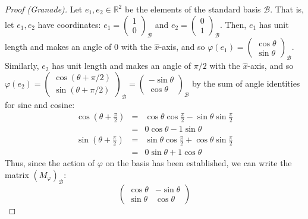 \documentclass[10pt]{article}
\newcommand{\R}{\mathbb{R}}
\renewcommand{\phi}{\varphi}
\begin{document}
\begin{itemize}
\begin{proof} [Proof (Granade)]
Let $e_{1},e_{2}\in\R^{2}$ be the elements of the standard basis
$\mathcal{B}$. That is, let $e_{1},e_{2}$ have coordinates: $e_{1}=\left(\begin{matrix}1\\
0\end{matrix}\right)_{\mathcal{B}}$ and $e_{2}=\left(\begin{matrix}0\\
1\end{matrix}\right)_{\mathcal{B}}$. Then, $e_{1}$ has unit length and makes an angle of 0 with the $\hat{x}$-axis,
and so $\phi\left(e_{1}\right)=\left(\begin{matrix}\cos\theta\\
\sin\theta\end{matrix}\right)_{\mathcal{B}}$. Similarly, $e_{2}$ has unit length and makes an angle of $\pi/2$
with the $\hat{x}$-axis, and so $\phi\left(e_{2}\right)=\left(\begin{matrix}\cos\left(\theta+\pi/2\right)\\
\sin\left(\theta+\pi/2\right)\end{matrix}\right)_{\mathcal{B}}=\left(\begin{matrix}-\sin\theta\\
\cos\theta\end{matrix}\right)_{\mathcal{B}}$ by the sum of angle identities for sine and cosine:\begin{eqnarray*}
\cos\left(\theta+\frac{\pi}{2}\right) & = & \cos\theta\cos\frac{\pi}{2}-\sin\theta\sin\frac{\pi}{2}\\
 & = & 0\cos\theta-1\sin\theta\\
\sin\left(\theta+\frac{\pi}{2}\right) & = & \sin\theta\cos\frac{\pi}{2}+\cos\theta\sin\frac{\pi}{2}\\
 & = & 0\sin\theta+1\cos\theta\end{eqnarray*}
Thus, since the action of $\phi$ on the basis has been established,
we can write the matrix $\left(M_{\phi}\right)_{\mathcal{B}}$:\[
\left(\begin{matrix}\cos\theta & -\sin\theta\\
\sin\theta & \cos\theta\end{matrix}\right)\]
\end{proof}


\end{itemize}
\end{document}

